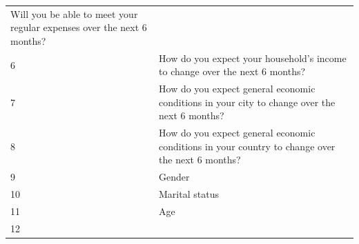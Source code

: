 \begin{longtable}[]{@{}ll@{}}
\begin{minipage}[t]{0.89\columnwidth}
Will you be able to meet your regular expenses over the next 6
months?\strut
\end{minipage}\tabularnewline
\begin{minipage}[t]{0.05\columnwidth}\raggedright
6\strut
\end{minipage} & \begin{minipage}[t]{0.89\columnwidth}\raggedright
How do you expect your household's income to change over the next 6
months?\strut
\end{minipage}\tabularnewline
\begin{minipage}[t]{0.05\columnwidth}\raggedright
7\strut
\end{minipage} & \begin{minipage}[t]{0.89\columnwidth}\raggedright
How do you expect general economic conditions in your city to change
over the next 6 months?\strut
\end{minipage}\tabularnewline
\begin{minipage}[t]{0.05\columnwidth}\raggedright
8\strut
\end{minipage} & \begin{minipage}[t]{0.89\columnwidth}\raggedright
How do you expect general economic conditions in your country to change
over the next 6 months?\strut
\end{minipage}\tabularnewline
\begin{minipage}[t]{0.05\columnwidth}\raggedright
9\strut
\end{minipage} & \begin{minipage}[t]{0.89\columnwidth}\raggedright
Gender\strut
\end{minipage}\tabularnewline
\begin{minipage}[t]{0.05\columnwidth}\raggedright
10\strut
\end{minipage} & \begin{minipage}[t]{0.89\columnwidth}\raggedright
Marital status\strut
\end{minipage}\tabularnewline
\begin{minipage}[t]{0.05\columnwidth}\raggedright
11\strut
\end{minipage} & \begin{minipage}[t]{0.89\columnwidth}\raggedright
Age\strut
\end{minipage}\tabularnewline
\begin{minipage}[t]{0.05\columnwidth}\raggedright
12\strut
\end{minipage} & \begin{minipage}[t]{0.89\columnwidth}\raggedright

\end{minipage}
\end{longtable}
